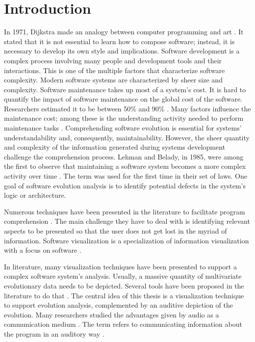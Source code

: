 
\chapter{Introduction}

In 1971, Dijkstra made an analogy between computer programming and art \cite{Dijkstra1971a}.
It stated that it is not essential to learn how to compose software; instead, it is necessary to develop its own style and implications. 
Software development is a complex process involving many people and development tools and their interactions. This is one of the multiple factors that characterize software complexity. 
Modern software systems are characterized by sheer size and complexity. Software maintenance takes up most of a system's cost. It is hard to quantify the impact of software maintenance on the global cost of the software. 
Researchers estimated it to be between 50\% and 90\% \cite{Davis1995, Sommerville1995, Erlikh2000, seacord2003}. Many factors influence the maintenance cost; among these is the understanding activity needed to perform maintenance tasks \cite{Corbi1989}. Comprehending software evolution is essential for systems' understandability and, consequently, maintainability. However, the sheer quantity and complexity of the information generated during systems development challenge the comprehension process. Lehman and Belady, in 1985, were among the first to observe that maintaining a software system becomes a more complex activity over time \cite{Lehman1985}. The term  was used for the first time in their set of laws.  One goal of software evolution analysis is to identify potential defects in the system's logic or architecture. 

Numerous techniques have been presented in the literature to facilitate program comprehension \cite{Lanza2001, DAmbros2006, Steinbrueckner2010, Wettel2011, Alexandru2019, SoftwareEvolution}. The main challenge they have to deal with is identifying relevant aspects to be presented so that the user does not get lost in the myriad of information. 
Software visualization is a specialization of information visualization with a focus on software \cite{Lanza2003}. 

In literature, many visualization techniques have been presented to support a complex software system's analysis. Usually, a massive quantity of multivariate evolutionary data needs to be depicted. Several tools have been proposed in the literature to do that \cite{Merino2018a}.
The central idea of this thesis is a visualization technique to support evolution analysis, complemented by an auditive depiction of the evolution. 
Many researchers studied the advantages given by audio as a communication medium \cite{Alty1995, Vickers2004, Boccuzzo2009, McIntosh2014, Mancino2017}.
The term  refers to communicating information about the program in an auditory way \cite{DiGiano1992}.

